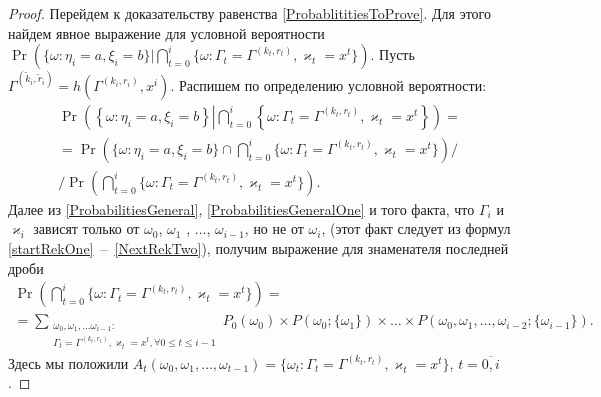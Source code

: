 \documentclass[a4paper,12pt,russian]{extarticle}
\begin{document}
\begin{proof}
Перейдем к доказательству равенства \eqref{ProbablititiesToProve}. Для этого найдем явное выражение для условной вероятности $\Pr (\{ \omega \colon \eta_i = a, \xi_i=b\} | \bigcap_{t=0}^{i}\{\omega\colon \Gamma_t=\Gamma^{(k_t,r_t)}, \varkappa_t=x^t\})$. Пусть $\Gamma^{(\tilde{k}_i,\tilde{r}_i)}=h(\Gamma^{(k_i,r_i)},x^i)$. Распишем по определению условной вероятности:
\begin{multline}
\Pr \left(\left\{ \omega \colon \eta_i = a, \xi_i=b\right\}  \left| \bigcap_{t=0}^{i}\left\{\omega\colon \Gamma_t=\Gamma^{(k_t,r_t)}, \varkappa_t=x^t\right\}\right.\right) = \\
=\Pr\left(\{ \omega \colon \eta_i = a, \xi_i=b \} \cap \bigcap_{t=0}^{i}\{\omega\colon \Gamma_t=\Gamma^{(k_t,r_t)}, \varkappa_t=x^t\}\right) \Big/ \\
\Big/
\Pr\left( \bigcap_{t=0}^{i}\{\omega\colon \Gamma_t=\Gamma^{(k_t,r_t)}, \varkappa_t=x^t\}\right).
\label{Construction:1}
\end{multline}
Далее из \eqref{ProbabilitiesGeneral}, \eqref{ProbabilitiesGeneralOne} и того факта, что $\Gamma_i$ и $\varkappa_{i}$ зависят только от $\omega_0$, $\omega_1$ , $\ldots$, $\omega_{i-1}$, но не от $\omega_i$, (этот факт следует из формул \eqref{startRekOne}~--~\eqref{NextRekTwo}), получим выражение для знаменателя последней дроби
\begin{multline}
\Pr\left( \bigcap_{t=0}^{i}\{\omega\colon \Gamma_t=\Gamma^{(k_t,r_t)}, \varkappa_t=x^t\}\right)=\\
=\sum_{\substack{\omega_0, \omega_1,\ldots \omega_{i-1} \colon \\ \Gamma_t=\Gamma^{(k_t,r_t)}, \varkappa_t=x^t, \forall 0\leqslant t \leqslant i-1}} P_0(\omega_0)\times P(\omega_0;\{\omega_1\})\times\ldots\times P(\omega_0,\omega_1,\ldots, \omega_{i-2};\{\omega_{i-1}\}).
\label{Construction:2}
\end{multline}
Здесь мы положили $A_t(\omega_0,\omega_1,\ldots,\omega_{t-1})=\{\omega_t \colon \Gamma_t=\Gamma^{(k_t,r_t)}, \varkappa_t=x^t\}$, $t=\overline{0,i}$.


\end{proof}
\end{document}
